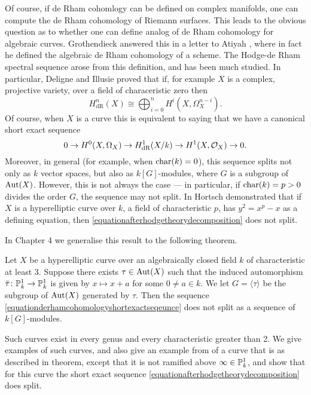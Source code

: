 Of course, if de Rham cohomlogy can be defined on complex manifolds, one can compute the de Rham cohomology of Riemann surfaces.
This leads to the obvious question as to whether one can define analog of de Rham cohomology for algebraic curves.
Grothendieck answered this in a letter to Atiyah , where in fact he defined the algebraic de Rham cohomology of a scheme.
The Hodge-de Rham spectral sequence arose from this definition, and has been much studied. 
In particular, Deligne and Illusie proved that if, for example $X$ is a complex, projective variety, over a field of characeristic zero then
    \begin{equation}\label{equationhodgetheorydecomposition}
    H^n_{\text{dR}}(X) \cong \bigoplus_{i=0}^n H^i(X,\Omega_X^{n-i}).
    \end{equation}
Of course, when $X$ is a curve this is equivalent to saying that we have a canonical short exact sequence
    \begin{equation}\label{equationafterhodgetheorydecomposition}
    0 \rightarrow {H^0(X,\Omega_X)} \rightarrow H_{\text {dR}}^1(X/k) \rightarrow H^1(X,\mathcal{O}_X) \rightarrow 0.
    \end{equation}
Moreover, in general (for example, when $\operatorname{char}(k) = 0$), this sequence splits not only as $k$ vector spaces, but also as $k[G]$-modules, where $G$ is a subgroup of $\operatorname{Aut}(X)$.
However, this is not always the case --- in particular, if $\operatorname{char}(k) = p >0$ divides the order $G$, the sequence may not split.
In  Hortsch demonstrated that if $X$ is a hyperelliptic curve over $k$, a field of characteristic $p$, has $y^2 = x^p-x$ as a defining equation, then \eqref{equationafterhodgetheorydecomposition} does not split.

In Chapter 4 we generalise this result to the following theorem.
    \begin{thm}
    Let $X$ be a hyperelliptic curve over an algebraically closed field $k$ of characteristic at least 3.
    Suppose there exists $\tau \in \operatorname{Aut}(X)$ such that the induced automorphism $\bar \tau \colon \mathbb P_k^1 \rightarrow \mathbb P_k^1$ is given by $x \mapsto x+a$ for some $0 \neq a \in k$.
    We let $G = \langle \tau \rangle$ be the subgroup of $\operatorname{Aut}(X)$ generated by $\tau$.
    Then the sequence \eqref{equationderhamcohomologyshortexactseqeunce} does not split as a sequence of $k[G]$-modules.
    \end{thm}
Such curves exist in every genus and every characteristic greater than 2.
We give examples of such curves, and also give an example from  of a curve that is as described in theorem, except that it is not ramified above $\infty \in {\mathbb P}_k^1$, and show that for this curve the short exact sequence \eqref{equationafterhodgetheorydecomposition} does split.

